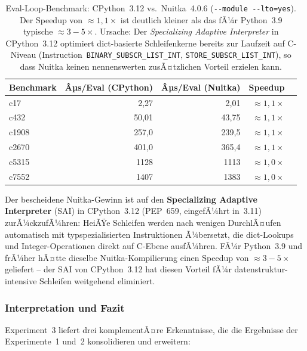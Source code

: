 ﻿\documentclass[a4paper,12pt]{article}
\theoremstyle{definition}
\begin{document}
\begin{table}[h]
  \centering
  \begin{tabular}{lrrrr}
    \toprule
    \textbf{Benchmark} & \textbf{Âµs/Eval (CPython)} & \textbf{Âµs/Eval (Nuitka)}
      & \textbf{Speedup} \\
    \midrule
    c17   &   2{,}27 &  2{,}01 & ${\approx}1{,}1\times$ \\
    c432  &  50{,}01 & 43{,}75 & ${\approx}1{,}1\times$ \\
    c1908 & 257{,}0  & 239{,}5 & ${\approx}1{,}1\times$ \\
    c2670 & 401{,}0  & 365{,}4 & ${\approx}1{,}1\times$ \\
    c5315 & 1128     & 1113    & ${\approx}1{,}0\times$ \\
    c7552 & 1407     & 1383    & ${\approx}1{,}0\times$ \\
    \bottomrule
  \end{tabular}
  \caption{Eval-Loop-Benchmark: CPython~3.12 vs.\ Nuitka~4.0.6
    (\texttt{-{}-module -{}-lto=yes}).  Der Speedup von
    ${\approx}1{,}1\times$ ist deutlich kleiner als das fÃ¼r Python~3.9
    typische ${\approx}3{-}5\times$.  Ursache: Der \emph{Specializing
    Adaptive Interpreter} in CPython~3.12 optimiert dict-basierte
    Schleifenkerne bereits zur Laufzeit auf C-Niveau
    (Instruction~\texttt{BINARY\_SUBSCR\_LIST\_INT},
    \texttt{STORE\_SUBSCR\_LIST\_INT}), so dass Nuitka keinen nennenswerten
    zusÃ¤tzlichen Vorteil erzielen kann.}
  \label{tab:nuitka-speedup}
\end{table}

Der bescheidene Nuitka-Gewinn ist auf den \textbf{Specializing Adaptive
Interpreter} (SAI) in CPython~3.12 (PEP~659, eingefÃ¼hrt in~3.11)
zurÃ¼ckzufÃ¼hren: HeiÃŸe Schleifen werden nach wenigen DurchlÃ¤ufen
automatisch mit typspezialisierten Instruktionen Ã¼bersetzt, die
dict-Lookups und Integer-Operationen direkt auf C-Ebene ausfÃ¼hren.
FÃ¼r Python~3.9 und frÃ¼her hÃ¤tte dieselbe Nuitka-Kompilierung einen
Speedup von ${\approx}3{-}5\times$ geliefert -- der SAI von CPython~3.12
hat diesen Vorteil fÃ¼r datenstruktur-intensive Schleifen weitgehend
eliminiert.

\subsubsection{Interpretation und Fazit}

Experiment~3 liefert drei komplementÃ¤re Erkenntnisse, die die
Ergebnisse der Experimente~1 und~2 konsolidieren und erweitern:
\end{document}
